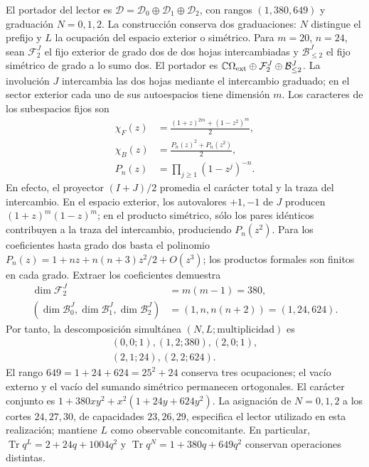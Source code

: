 El portador del lector es $\mathcal D=\mathcal D_0\oplus\mathcal D_1
\oplus\mathcal D_2$, con rangos $(1,380,649)$ y graduación $N=0,1,2$.
La construcción conserva dos graduaciones: $N$ distingue el prefijo y $L$
la ocupación del espacio exterior o simétrico. Para $m=20$, $n=24$,
sean $\mathcal F_2^J$ el fijo exterior de grado dos de dos hojas intercambiadas
y $\mathcal B_{\le2}^J$ el fijo simétrico de grado a lo sumo dos. El portador es
$\mathbb C\Omega_{\rm ext}\oplus\mathcal F_2^J\oplus\mathcal B_{\le2}^J$.
La involución $J$ intercambia las dos hojas mediante el intercambio graduado;
en el sector exterior cada uno de sus autoespacios tiene dimensión $m$.
Los caracteres de los subespacios fijos son
\begin{equation}
 \begin{aligned}
 \chi_F(z)&=\frac{(1+z)^{2m}+(1-z^2)^m}{2},\\
 \chi_B(z)&=\frac{P_n(z)^2+P_n(z^2)}{2},\\
 P_n(z)&=\prod_{j\ge1}(1-z^j)^{-n}.
 \end{aligned}
 \label{md:r27:caracteres-fock}
\end{equation}
En efecto, el proyector $(I+J)/2$ promedia el carácter total y la traza
del intercambio. En el espacio exterior, los autovalores $+1,-1$ de $J$
producen $(1+z)^m(1-z)^m$; en el producto simétrico, sólo los pares idénticos
contribuyen a la traza del intercambio, produciendo $P_n(z^2)$.
Para los coeficientes hasta grado dos basta el polinomio
$P_n(z)=1+nz+n(n+3)z^2/2+O(z^3)$; los productos formales son finitos en
cada grado. Extraer los coeficientes demuestra
\begin{equation}
 \begin{split}
 \dim\mathcal F_2^J&=m(m-1)=380,\\
 (\dim\mathcal B_0^J,\dim\mathcal B_1^J,\dim\mathcal B_2^J)
 &=(1,n,n(n+2))=(1,24,624).
 \end{split}
 \label{md:r27:grados-fock}
\end{equation}
Por tanto, la descomposición simultánea $(N,L;\text{multiplicidad})$ es
\[
 \begin{gathered}
 (0,0;1),(1,2;380),(2,0;1),\\
 (2,1;24),(2,2;624).
 \end{gathered}
\]
El rango $649=1+24+624=25^2+24$ conserva tres ocupaciones; el vacío externo
y el vacío del sumando simétrico permanecen ortogonales. El carácter conjunto
es $1+380xy^2+x^2(1+24y+624y^2)$.
La asignación de $N=0,1,2$ a los cortes $24,27,30$, de capacidades
$23,26,29$, especifica el lector utilizado en esta realización; mantiene $L$
como observable concomitante. En particular,
$\operatorname{Tr}q^L=2+24q+1004q^2$ y
$\operatorname{Tr}q^N=1+380q+649q^2$ conservan operaciones distintas.

